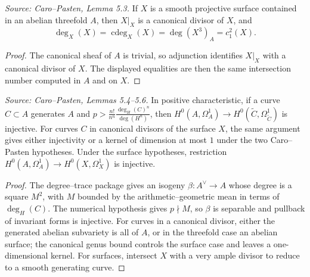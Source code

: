 \begin{lemma}
  \label{lem:cp_degrees_surface_threefold}
  \textit{Source: Caro--Pasten, Lemma 5.3.}
  If \(X\) is a smooth projective surface contained in an abelian threefold
  \(A\), then \(X|_X\) is a canonical divisor of \(X\), and
  \[
    \deg_X(X)=\operatorname{cdeg}_X(X)=\deg(X^3)_A=c_1^2(X).
  \]
\end{lemma}
\begin{proof}
  The canonical sheaf of \(A\) is trivial, so adjunction identifies \(X|_X\)
  with a canonical divisor of \(X\).  The displayed equalities are then the
  same intersection number computed in \(A\) and on \(X\).
\end{proof}

\begin{lemma}
  \label{lem:cp_injectivity_one_forms}
  \textit{Source: Caro--Pasten, Lemmas 5.4--5.6.}
  In positive characteristic, if a curve \(C\subset A\) generates \(A\) and
  \(p>\frac{n!}{n^n}\frac{\deg_H(C)^n}{\deg(H^n)}\), then
  \(H^0(A,\Omega^1_A)\to H^0(\widetilde C,\Omega^1_{\widetilde C})\) is
  injective.  For curves \(C\) in canonical divisors of the surface \(X\), the
  same argument gives either injectivity or a kernel of dimension at most
  \(1\) under the two Caro--Pasten hypotheses.  Under the surface hypotheses,
  restriction \(H^0(A,\Omega^1_A)\to H^0(X,\Omega^1_X)\) is injective.
\end{lemma}
\begin{proof}
  The degree--trace package gives an isogeny
  \(\beta:A^\vee\to A\) whose degree is a square \(M^2\), with
  \(M\) bounded by the arithmetic--geometric mean in terms of
  \(\deg_H(C)\).  The numerical hypothesis gives \(p\nmid M\), so \(\beta\)
  is separable and pullback of invariant forms is injective.  For curves in a
  canonical divisor, either the generated abelian subvariety is all of \(A\),
  or in the threefold case an abelian surface; the canonical genus bound
  controls the surface case and leaves a one-dimensional kernel.  For surfaces,
  intersect \(X\) with a very ample divisor to reduce to a smooth generating
  curve.
\end{proof}

